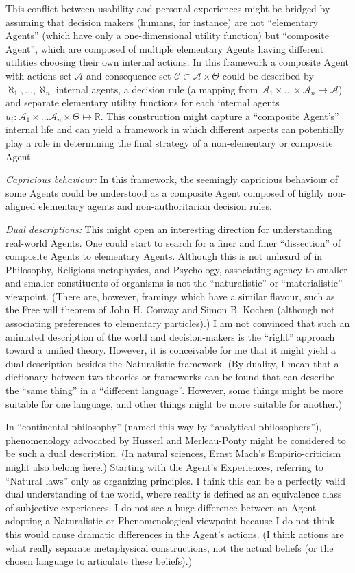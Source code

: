 \documentclass{article}
\begin{document}
This conflict between usability and personal experiences might be bridged by assuming that decision makers (humans, for instance) are not ``elementary Agents'' (which have only a one-dimensional utility function) but ``composite Agent'', which are composed of multiple elementary Agents having different utilities choosing their own internal actions.
In this framework a composite Agent with actions set $\mathcal{A}$ and consequence set $\mathcal{C} \subset \mathcal{A} \times \Theta$ could be described by 
$\aleph_1,\dots,\aleph_n$ internal agents, a decision rule (a mapping from $\mathcal{A}_1 \times \dots \times \mathcal{A}_n \mapsto \mathcal{A}$) and separate elementary utility functions for each internal agents $u_i: \mathcal{A}_1 \times \dots \mathcal{A}_n \times \Theta \mapsto \mathbb{R}$.
This construction might capture a “composite Agent's” internal life and can yield a framework in which different aspects can potentially play a role in determining the final strategy of a non-elementary or composite Agent.

{\it Capricious behaviour:}
In this framework, the seemingly capricious behaviour of some Agents could be understood as a composite Agent composed of highly non-aligned elementary agents and non-authoritarian decision rules.

{\it Dual descriptions:}
This might open an interesting direction for understanding real-world Agents. One could start to search for a finer and finer ``dissection'' of composite Agents to elementary Agents. Although this is not unheard of in Philosophy, Religious metaphysics, and Psychology, associating agency to smaller and smaller constituents of organisms is not the ``naturalistic'' or ``materialistic'' viewpoint.
(There are, however, framings which have a similar flavour, such as the Free will theorem of John H. Conway and Simon B. Kochen (although not associating preferences to elementary particles).)
I am not convinced that such an animated description of the world and decision-makers is the ``right'' approach toward a unified theory. However, it is conceivable for me that it might yield a dual description besides the Naturalistic framework. (By duality, I mean that a dictionary between two theories or frameworks can be found that can describe the ``same thing'' in a ``different language''. However, some things might be more suitable for one language, and other things might be more suitable for another.)

In ``continental philosophy'' (named this way by ``analytical philosophers''), phenomenology advocated by Husserl and Merleau-Ponty might be considered to be such a dual description. (In natural sciences, Ernst Mach’s Empirio-criticism might also belong here.) Starting with the Agent's Experiences, referring to ``Natural laws'' only as organizing principles. I think this can be a perfectly valid dual understanding of the world, where reality is defined as an equivalence class of subjective experiences.
I do not see a huge difference between an Agent adopting a Naturalistic or Phenomenological viewpoint because I do not think this would cause dramatic differences in the Agent’s actions.
(I think actions are what really separate metaphysical constructions, not the actual beliefs (or the chosen language to articulate these beliefs).)
\end{document}

